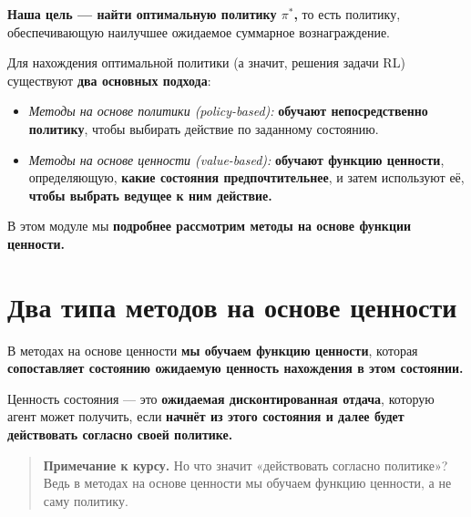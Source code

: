\documentclass[11pt,a4paper]{article}
\begin{document}
\textbf{Наша цель --- найти оптимальную политику \(\pi^*\),} то есть политику, обеспечивающую наилучшее ожидаемое суммарное вознаграждение.

Для нахождения оптимальной политики (а значит, решения задачи RL) существуют \textbf{два основных подхода}:

\begin{itemize}
\tightlist
\item
  \emph{Методы на основе политики (policy-based):} \textbf{обучают непосредственно политику}, чтобы выбирать действие по заданному состоянию.
\item
  \emph{Методы на основе ценности (value-based):} \textbf{обучают функцию ценности}, определяющую, \textbf{какие состояния предпочтительнее}, и затем используют её, \textbf{чтобы выбрать ведущее к ним действие.}
\end{itemize}


В этом модуле мы \textbf{подробнее рассмотрим методы на основе функции ценности.}

\section{Два типа методов на основе ценности}\label{two-types-of-value-based-methods}

В методах на основе ценности \textbf{мы обучаем функцию ценности}, которая \textbf{сопоставляет состоянию ожидаемую ценность нахождения в этом состоянии.}


Ценность состояния --- это \textbf{ожидаемая дисконтированная отдача}, которую агент может получить, если \textbf{начнёт из этого состояния и далее будет действовать согласно своей политике.}

\begin{quote}
\textbf{Примечание к курсу.} Но что значит «действовать согласно политике»? Ведь в методах на основе ценности мы обучаем функцию ценности, а не саму политику.
\end{quote}
\end{document}
